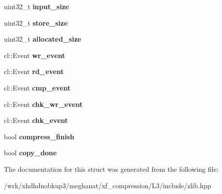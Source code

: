\begin{DoxyCompactItemize}
\item 
\hypertarget{structxf_1_1compression_1_1buffers_a1861ace8053ed2c13ab89ea2930ba6d7}{uint32\-\_\-t {\bfseries input\-\_\-size}}\label{structxf_1_1compression_1_1buffers_a1861ace8053ed2c13ab89ea2930ba6d7}

\item 
\hypertarget{structxf_1_1compression_1_1buffers_ac5966460c9c1cdf0b1788cdbd6f5154f}{uint32\-\_\-t {\bfseries store\-\_\-size}}\label{structxf_1_1compression_1_1buffers_ac5966460c9c1cdf0b1788cdbd6f5154f}

\item 
\hypertarget{structxf_1_1compression_1_1buffers_ac616c2e506c9645444effb67c3b1a465}{uint32\-\_\-t {\bfseries allocated\-\_\-size}}\label{structxf_1_1compression_1_1buffers_ac616c2e506c9645444effb67c3b1a465}

\item 
\hypertarget{structxf_1_1compression_1_1buffers_a0ce3c454c580f2027e0796d454cd30e4}{cl\-::\-Event {\bfseries wr\-\_\-event}}\label{structxf_1_1compression_1_1buffers_a0ce3c454c580f2027e0796d454cd30e4}

\item 
\hypertarget{structxf_1_1compression_1_1buffers_a4fd659a33f8f0298605415dd42f92799}{cl\-::\-Event {\bfseries rd\-\_\-event}}\label{structxf_1_1compression_1_1buffers_a4fd659a33f8f0298605415dd42f92799}

\item 
\hypertarget{structxf_1_1compression_1_1buffers_ae2e6d8ae62559fc3084ec9183dd75e12}{cl\-::\-Event {\bfseries cmp\-\_\-event}}\label{structxf_1_1compression_1_1buffers_ae2e6d8ae62559fc3084ec9183dd75e12}

\item 
\hypertarget{structxf_1_1compression_1_1buffers_a1841f2e58b1dfcea72e10b1dc5760f21}{cl\-::\-Event {\bfseries chk\-\_\-wr\-\_\-event}}\label{structxf_1_1compression_1_1buffers_a1841f2e58b1dfcea72e10b1dc5760f21}

\item 
\hypertarget{structxf_1_1compression_1_1buffers_a7eb1c54115cc8f4a352fe55244dec57c}{cl\-::\-Event {\bfseries chk\-\_\-event}}\label{structxf_1_1compression_1_1buffers_a7eb1c54115cc8f4a352fe55244dec57c}

\item 
\hypertarget{structxf_1_1compression_1_1buffers_a2b6968d5742069499c3dfb2a6c931db7}{bool {\bfseries compress\-\_\-finish}}\label{structxf_1_1compression_1_1buffers_a2b6968d5742069499c3dfb2a6c931db7}

\item 
\hypertarget{structxf_1_1compression_1_1buffers_a57ea9701dc47c60cc639d0ba520e2e3b}{bool {\bfseries copy\-\_\-done}}\label{structxf_1_1compression_1_1buffers_a57ea9701dc47c60cc639d0ba520e2e3b}

\end{DoxyCompactItemize}


The documentation for this struct was generated from the following file\-:\begin{DoxyCompactItemize}
\item 
/wrk/xhdhdnobkup3/meghanat/xf\-\_\-compression/\-L3/include/zlib.\-hpp\end{DoxyCompactItemize}
